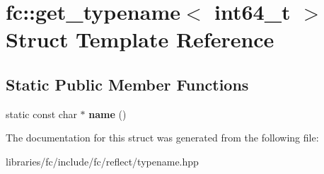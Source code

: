 \hypertarget{structfc_1_1get__typename_3_01int64__t_01_4}{}\section{fc\+:\+:get\+\_\+typename$<$ int64\+\_\+t $>$ Struct Template Reference}
\label{structfc_1_1get__typename_3_01int64__t_01_4}
\subsection*{Static Public Member Functions}
\begin{DoxyCompactItemize}
\item 
\mbox{\label{structfc_1_1get__typename_3_01int64__t_01_4_aa2e637df81245dc4fbd661fa1c1f38ff}} 
static const char $\ast$ {\bfseries name} ()
\end{DoxyCompactItemize}


The documentation for this struct was generated from the following file\+:\begin{DoxyCompactItemize}
\item 
libraries/fc/include/fc/reflect/typename.\+hpp\end{DoxyCompactItemize}
